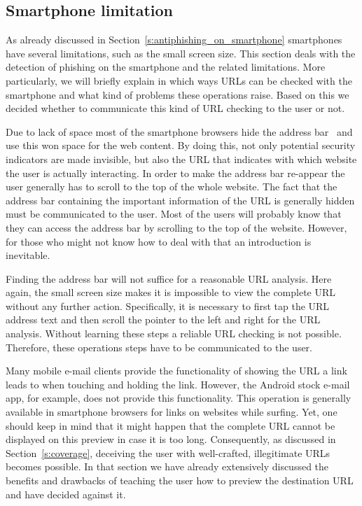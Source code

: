 \subsection{Smartphone limitation}
As already discussed in Section~\autoref{s:antiphishing_on_smartphone} smartphones have several limitations, such as the small screen size. 
This section deals with the detection of phishing on the smartphone and the related limitations.
More particularly, we will briefly explain in which ways URLs can be checked with the smartphone and what kind of problems these operations raise.
Based on this we decided whether to communicate this kind of URL checking to the user or not.

\begin{description}[leftmargin=0cm]
	\item[Invisible Address Bar] Due to lack of space most of the smartphone browsers hide the address bar~\cite{amrutkar2012measuring} and use this won space for the web content. 
By doing this, not only potential security indicators are made invisible, but also the URL that indicates with which website the user is actually interacting.
In order to make the address bar re-appear the user generally has to scroll to the top of the whole website.
The fact that the address bar containing the important information of the URL is generally hidden must be communicated to the user.
Most of the users will probably know that they can access the address bar by scrolling to the top of the website.
However, for those who might not know how to deal with that an introduction is inevitable.

	\item[Analyze Complete URL Via Address Bar] Finding the address bar will not suffice for a reasonable URL analysis. 
Here again, the small screen size makes it is impossible to view the complete URL without any further action.
Specifically, it is necessary to first tap the URL address text and then scroll the pointer to the left and right for the URL analysis.
Without learning these steps a reliable URL checking is not possible. 
Therefore, these operations steps have to be communicated to the user.

	\item[Show URL Before Click] Many mobile e-mail clients provide the functionality of showing the URL a link leads to when touching and holding the link.
However, the Android stock e-mail app, for example, does not provide this functionality.
This operation is generally available in smartphone browsers for links on websites while surfing.
Yet, one should keep in mind that it might happen that the complete URL cannot be displayed on this preview in case it is too long. 
Consequently, as discussed in Section~\autoref{s:coverage}, deceiving the user with well-crafted, illegitimate URLs becomes possible. 
In that section we have already extensively discussed the benefits and drawbacks of teaching the user how to preview the destination URL and have decided against it.


\end{description}
